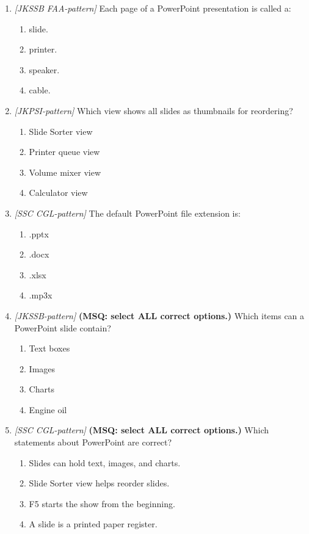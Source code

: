 \documentclass[11pt]{article}
\begin{document}
\begin{enumerate}[label=\textbf{Q\arabic*.}, leftmargin=*]
\item \textit{[JKSSB FAA-pattern]} Each page of a PowerPoint presentation is called a:
  \begin{enumerate}[label=\Alph*.]
    \item slide.
    \item printer.
    \item speaker.
    \item cable.
  \end{enumerate}
\item \textit{[JKPSI-pattern]} Which view shows all slides as thumbnails for reordering?
  \begin{enumerate}[label=\Alph*.]
    \item Slide Sorter view
    \item Printer queue view
    \item Volume mixer view
    \item Calculator view
  \end{enumerate}
\item \textit{[SSC CGL-pattern]} The default PowerPoint file extension is:
  \begin{enumerate}[label=\Alph*.]
    \item .pptx
    \item .docx
    \item .xlsx
    \item .mp3x
  \end{enumerate}
\item \textit{[JKSSB-pattern]} \textbf{(MSQ: select ALL correct options.)} Which items can a PowerPoint slide contain?
  \begin{enumerate}[label=\Alph*.]
    \item Text boxes
    \item Images
    \item Charts
    \item Engine oil
  \end{enumerate}
\item \textit{[SSC CGL-pattern]} \textbf{(MSQ: select ALL correct options.)} Which statements about PowerPoint are correct?
  \begin{enumerate}[label=\Alph*.]
    \item Slides can hold text, images, and charts.
    \item Slide Sorter view helps reorder slides.
    \item F5 starts the show from the beginning.
    \item A slide is a printed paper register.
  \end{enumerate}
\end{enumerate}
\def\JKSSBLessonID{31}\def\JKSSBAnswers{0}
\end{document}
